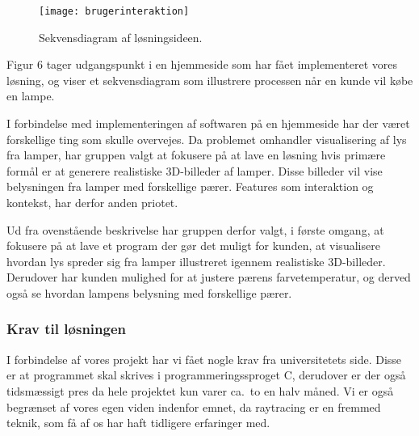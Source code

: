 \begin{figure}[H]
   \centering
   \texttt{[image: brugerinteraktion]}
   \caption{Sekvensdiagram af løsningsideen.}
\end{figure}

Figur 6 tager udgangspunkt i en hjemmeside som har fået implementeret vores løsning, og viser et sekvensdiagram som illustrere processen når en kunde vil købe en lampe.  

I forbindelse med implementeringen af softwaren på en hjemmeside har der været forskellige ting som skulle overvejes. Da problemet omhandler visualisering af lys fra lamper, har gruppen valgt at fokusere på at lave en løsning hvis primære formål er at generere realistiske 3D-billeder af lamper. Disse billeder vil vise belysningen fra lamper med forskellige pærer. Features som interaktion og kontekst, har derfor anden priotet. 

Ud fra ovenstående beskrivelse har gruppen derfor valgt, i første omgang, at fokusere på at lave et program der gør det muligt for kunden, at visualisere hvordan lys spreder sig fra lamper illustreret igennem realistiske 3D-billeder. Derudover har kunden mulighed for at justere pærens farvetemperatur, og derved også se hvordan lampens belysning med forskellige pærer.  


\subsubsection{Krav til løsningen}

I forbindelse af vores projekt har vi fået nogle krav fra universitetets side. Disse er at programmet skal skrives i programmeringssproget C, derudover er der også tidsmæssigt pres da hele projektet kun varer ca.\ to en halv måned. 
Vi er også begrænset af vores egen viden indenfor emnet, da raytracing er en fremmed teknik, som få af os har haft tidligere erfaringer med. 


